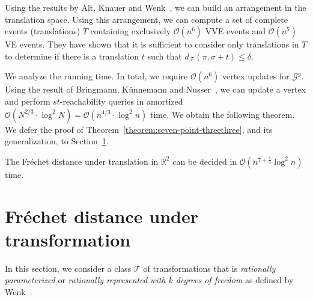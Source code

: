 \documentclass[thm-restate]{lipics-v2021}
\theoremstyle{remark}
\newcommand{\Oh}{\mathcal{O}}
\newcommand{\graph}[0]{\mathcal{G}}
\newcommand{\df}[1]{d_{\mathcal{F}}(#1)}
\newcommand{\reals}[0]{\mathbb{R}}
\newcommand{\ggraph}[0]{\graph^g}
\newcommand{\trans}[0]{\mathcal{T}}
\begin{document}
Using the results by Alt, Knauer and Wenk~\cite{altMatchingPolygonalCurves2001}, we can build an arrangement in the translation space. Using this arrangement, we can compute a set of complete events (translations) $T$ containing exclusively $\Oh(n^6)$ VVE events and $\Oh(n^5)$ VE events. They have shown that it is sufficient to consider only translations in $T$ to determine if there is a translation $t$ such that $\df{\pi, \sigma + t} \leq \delta$. 

We analyze the running time. In total, we require $\Oh(n^6)$ vertex updates for $\ggraph$. Using the result of Bringmann, K\"unnemann and Nusser~\cite{bringmannFrechetDistanceTranslation2021}, we can update a vertex and perform $st$-reachability queries in amortized $\Oh(N^{2/3} \cdot \log^2 N) = \Oh(n^{4/3} \cdot \log^2 n)$ time. We obtain the following theorem. We defer the proof of Theorem~\ref{theorem:seven-point-threethree}, and its generalization, to Section~\ref{sec:together}. 
\begin{theorem}
    \label{theorem:seven-point-threethree}
    The Fréchet distance under translation in $\reals^2$ can be decided in $\Oh(n^{7+ \frac{1}{3}} \log^2 n)$ time. 
\end{theorem}

\section{Fréchet distance under transformation} \label{sec:together}

In this section, we consider a class $\trans$ of transformations that is \emph{rationally parameterized} or \emph{rationally represented with $k$ degrees of freedom} as defined by Wenk~\cite{wenkShapeMatchingHigher2003}.
\end{document}
